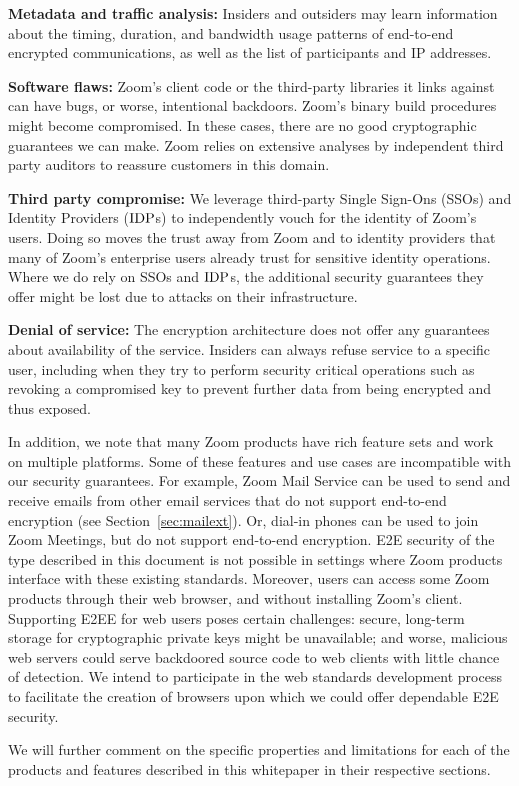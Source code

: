 \begin{description}
	\item {\bf Metadata and traffic analysis:} Insiders and outsiders may learn information about
		the timing, duration, and bandwidth usage patterns of end-to-end encrypted communications,
		as well as the list of participants and IP addresses.
	\item {\bf Software flaws:} Zoom's client code or the third-party libraries it links against can
		have bugs, or worse, intentional backdoors. Zoom's binary build procedures might become
		compromised. In these cases, there are no good cryptographic guarantees we can make. Zoom
		relies on extensive analyses by independent third party auditors to reassure customers in
		this domain.
	\item {\bf Third party compromise:} We leverage third-party Single Sign-Ons (SSOs) and Identity
		Providers ($\mathrm{IDP}$s) to independently vouch for the identity of Zoom's users. Doing so moves
		the trust away from Zoom and to identity providers that many of Zoom's enterprise users
		already trust for sensitive identity operations. Where we do rely on SSOs and $\mathrm{IDP}$s, the
		additional security guarantees they offer might be lost due to attacks on their
		infrastructure.
	\item {\bf Denial of service:} The encryption architecture does not offer any guarantees about
		availability of the service. Insiders can always refuse service to a specific user,
		including when they try to perform security critical operations such as revoking a
		compromised key to prevent further data from being encrypted and thus exposed.
\end{description}

In addition, we note that many Zoom products have rich feature sets and work on multiple platforms.
Some of these features and use cases are incompatible with our security guarantees. For example,
Zoom Mail Service can be used to send and receive emails from other email services that do not
support end-to-end encryption (see Section~\ref{sec:mailext}). Or, dial-in phones can be used to
join Zoom Meetings, but do not support end-to-end encryption. E2E security of the type described in
this document is not possible in settings where Zoom products interface with these existing
standards. Moreover, users can access some Zoom products through their web browser, and without
installing Zoom's client. Supporting E2EE for web users poses certain challenges: secure, long-term
storage for cryptographic private keys might be unavailable; and worse, malicious web servers could
serve backdoored source code to web clients with little chance of detection. We intend to
participate in the web standards development process to facilitate the creation of browsers upon
which we could offer dependable E2E security.

We will further comment on the specific properties and limitations for each of the products and
features described in this whitepaper in their respective sections.
